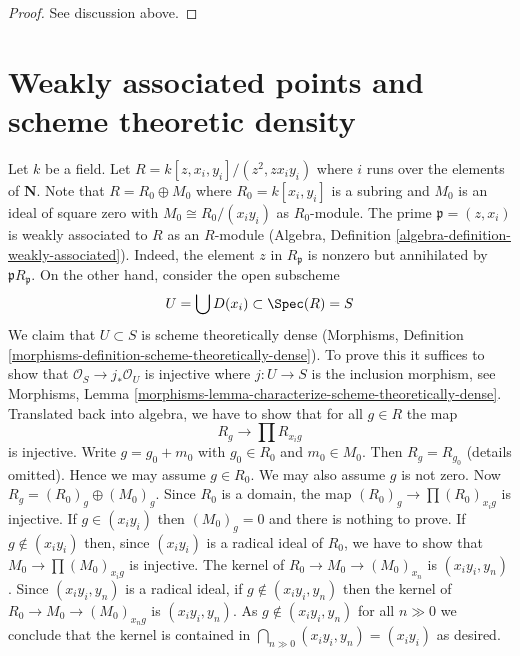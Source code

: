 \begin{proof}
See discussion above.
\end{proof}





\section{Weakly associated points and scheme theoretic density}
\label{section-weak-ass-dense}

\noindent
Let $k$ be a field. Let $R = k[z, x_i, y_i]/(z^2, zx_iy_i)$ where
$i$ runs over the elements of $\mathbf{N}$. Note that $R = R_0 \oplus M_0$ where
$R_0 = k[x_i, y_i]$ is a subring and $M_0$ is an ideal of square zero
with $M_0 \cong R_0/(x_iy_i)$ as $R_0$-module. The prime
$\mathfrak p = (z, x_i)$ is weakly associated to $R$ as an $R$-module
(Algebra, Definition \ref{algebra-definition-weakly-associated}).
Indeed, the element $z$ in $R_\mathfrak p$ is nonzero but annihilated
by $\mathfrak pR_\mathfrak p$. On the other hand, consider the open
subscheme
$$
U = \bigcup D(x_i) \subset \Spec(R) = S
$$
We claim that $U \subset S$ is scheme theoretically dense
(Morphisms, Definition \ref{morphisms-definition-scheme-theoretically-dense}).
To prove this it suffices to show that $\mathcal{O}_S \to j_*\mathcal{O}_U$
is injective where $j : U \to S$ is the inclusion morphism, see 
Morphisms, Lemma \ref{morphisms-lemma-characterize-scheme-theoretically-dense}.
Translated back into algebra, we have to show that for all $g \in R$
the map
$$
R_g \longrightarrow \prod R_{x_ig}
$$
is injective. Write $g = g_0 + m_0$ with $g_0 \in R_0$ and $m_0 \in M_0$.
Then $R_g = R_{g_0}$ (details omitted). Hence we may assume $g \in R_0$.
We may also assume $g$ is not zero. Now $R_g = (R_0)_g \oplus (M_0)_g$.
Since $R_0$ is a domain, the map $(R_0)_g \to \prod (R_0)_{x_ig}$ is
injective. If $g \in (x_iy_i)$ then $(M_0)_g = 0$ and there is nothing
to prove. If $g \not \in (x_iy_i)$ then, since
$(x_iy_i)$ is a radical ideal of $R_0$, we have to show that
$M_0 \to \prod (M_0)_{x_ig}$ is injective. The kernel of
$R_0 \to M_0 \to (M_0)_{x_n}$ is $(x_iy_i, y_n)$. Since
$(x_iy_i, y_n)$ is a radical ideal, if $g \not \in (x_iy_i, y_n)$
then the kernel of $R_0 \to M_0 \to (M_0)_{x_ng}$ is $(x_iy_i, y_n)$.
As $g \not \in (x_iy_i, y_n)$ for all $n \gg 0$ we conclude that
the kernel is contained in $\bigcap_{n \gg 0} (x_iy_i, y_n) = (x_iy_i)$
as desired.

